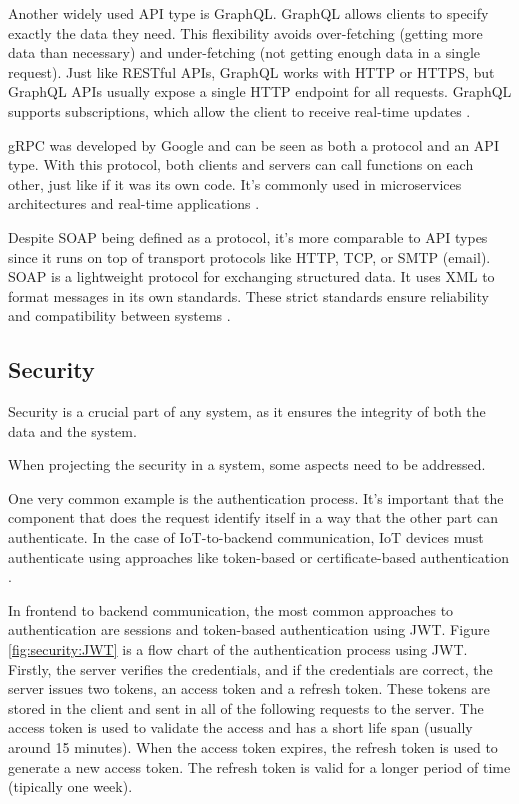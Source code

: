 Another widely used API type is GraphQL.
GraphQL allows clients to specify exactly the data they need. This
flexibility avoids over-fetching (getting more data than necessary) and
under-fetching (not getting enough data in a single request).
Just like \gls{REST}ful \gls{API}s, GraphQL works with \gls{HTTP} or \gls{HTTPS},
but GraphQL \gls{API}s usually expose a single \gls{HTTP} endpoint for all
requests. GraphQL supports subscriptions, which allow the client to receive
real-time updates \cite{9101226}.

\gls{gRPC} was developed by Google and can be seen as both a protocol and an
\gls{API} type. With this protocol, both clients and servers can call
functions on each other, just like if it was its own code.
It's commonly used in microservices architectures and real-time applications \cite{newton2024benchmarking}.

Despite \gls{SOAP} being defined as a protocol, it's more comparable to \gls{API}
types since it runs on top of transport protocols like \gls{HTTP}, \gls{TCP}, or
\gls{SMTP} (email).
\gls{SOAP} is a lightweight protocol for exchanging structured data. It uses \gls{XML}
to format messages in its own standards. These strict standards ensure
reliability and compatibility between systems \cite{newton2024benchmarking}.

\subsection{Security}

Security is a crucial part of any system, as it ensures the integrity of both
the data and the system.

When projecting the security in a system, some aspects need to be addressed.

One very common example is the authentication process.
It's important that the component that does the request identify itself
in a way that the other part can authenticate.
In the case of \gls{IoT}-to-backend communication, \gls{IoT} devices must authenticate
using approaches like token-based or certificate-based authentication \cite{schiller2022landscape}.

In frontend to backend communication, the most common approaches to
authentication are sessions and token-based authentication using \gls{JWT}.
Figure \ref{fig:security:JWT}
is a flow chart of the authentication process using \gls{JWT}.
Firstly, the server verifies the credentials, and if the credentials are
correct, the server issues two tokens, an access token and a refresh
token. These tokens are stored in the client and sent in all of the
following requests to the server. The access token is used to validate
the access and has a short life span (usually around 15 minutes). When
the access token expires, the refresh token is used to generate a new
access token. The refresh token is valid for a longer period of time (tipically
one week).

